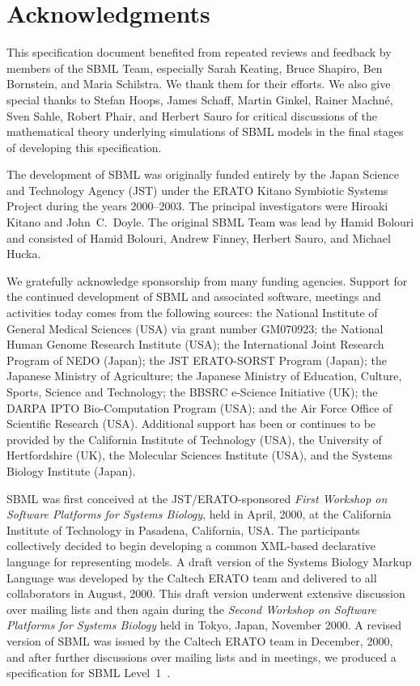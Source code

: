 
\section{Acknowledgments}
\label{sec:acknowledgements}
\label{sec:acknowledgments}

This specification document benefited from repeated reviews and
feedback by members of the SBML Team, especially Sarah Keating,
Bruce Shapiro, Ben Bornstein, and Maria Schilstra.  We thank them
for their efforts.  We also give special thanks to Stefan Hoops,
James Schaff, Martin Ginkel, Rainer Machn\'{e}, Sven Sahle, Robert
Phair, and Herbert Sauro for critical discussions of the
mathematical theory underlying simulations of SBML models in the
final stages of developing this specification.

The development of SBML was originally funded entirely by the
Japan Science and Technology Agency (JST) under the ERATO Kitano
Symbiotic Systems Project during the years 2000--2003.  The
principal investigators were Hiroaki Kitano and John~C.\ Doyle.
The original SBML Team was lead by Hamid Bolouri and consisted of
Hamid Bolouri, Andrew Finney, Herbert Sauro, and Michael Hucka.

We gratefully acknowledge sponsorship from many funding agencies.
Support for the continued development of SBML and associated
software, meetings and activities today comes from the following
sources: the National Institute of General Medical Sciences (USA)
via grant number GM070923; the National Human Genome Research
Institute (USA); the International Joint Research Program of NEDO
(Japan); the JST ERATO-SORST Program (Japan); the Japanese
Ministry of Agriculture; the Japanese Ministry of Education,
Culture, Sports, Science and Technology; the BBSRC e-Science
Initiative (UK); the DARPA IPTO Bio-Computation Program (USA); and
the Air Force Office of Scientific Research (USA).  Additional
support has been or continues to be provided by the California
Institute of Technology (USA), the University of Hertfordshire
(UK), the Molecular Sciences Institute (USA), and the Systems
Biology Institute (Japan).

SBML was first conceived at the JST/ERATO-sponsored \emph{First
  Workshop on Software Platforms for Systems Biology}, held in
April, 2000, at the California Institute of Technology in
Pasadena, California, USA.  The participants collectively decided
to begin developing a common XML-based declarative language for
representing models.  A draft version of the Systems Biology
Markup Language was developed by the Caltech ERATO team and
delivered to all collaborators in August, 2000.  This draft
version underwent extensive discussion over mailing lists and then
again during the \emph{Second Workshop on Software Platforms for
  Systems Biology} held in Tokyo, Japan, November 2000.  A revised
version of SBML was issued by the Caltech ERATO team in December,
2000, and after further discussions over mailing lists and in
meetings, we produced a specification for SBML
Level~1~\citep{hucka:2001}.

